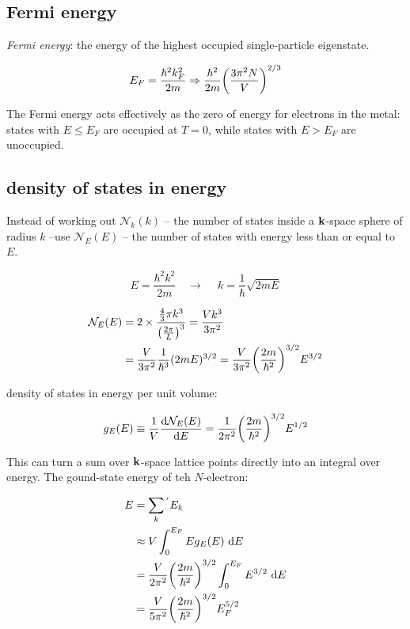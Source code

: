\documentclass[10pt, a4paper, twocolumn]{article}
\newcommand{\deff}[1]{\par \noindent \textit{#1}: }
\newcommand{\arr}{\ensuremath{\longrightarrow\ }}
\begin{document}
\subsection{Fermi energy}

\deff{Fermi energy}
the energy of the highest occupied single-particle eigenstate.

\[ E_F = \frac{\hbar ^2 k_F^2}{2m}
\Rightarrow \frac{\hbar ^2}{2m}
\qty(\frac{3 \pi ^2 N}{V} )^{2/3} \]

The Fermi energy acts effectively as the zero of energy for electrons in the metal: states with $E \leq E_F$ are occupied at $T=0$, while states with $E > E_F$ are unoccupied.

\subsection{density of states in energy}

Instead of working out $\mathcal N _k (k)$ -- the number of states inside a $\vb k$-space sphere of radius $k$ --use $\mathcal N_E(E)$ -- the number of states with energy less than or equal to $E$.

\[ E = \frac{\hbar ^2 k^2}{2m}
\quad \arr \quad k = \frac1\hbar \sqrt{2mE} \]

\begin{equation*}
\begin{aligned}
\mathcal N_E (E) &= 2 \times \frac{\frac43 \pi k^3}
{\qty(\frac{2\pi}{L})^3} = \frac{Vk^3}{3 \pi ^2}
\\ &= \frac{V}{3 \pi ^2} \frac{1}{\hbar ^3}
(2mE)^{3/2}
= \frac{V}{3 \pi ^2} \qty( \frac{2m}{\hbar ^2})^{3/2}
E^{3/2}
\end{aligned}
\end{equation*}

density of states in energy per unit volume:

\[ g_E(E) \equiv \frac1V \dv{\mathcal N_E(E)}{E}
= \frac{1}{2\pi ^2} \qty( \frac{2m}{\hbar ^2})^{3/2}
E^{1/2} \]

This can turn a sum over $\vb k$-space lattice points directly into an integral over energy. The gound-state energy of teh $N$-electron:

\begin{equation*}
\begin{aligned}
E &= \sum _k {}{}^{'} E_k
\\ & \approx V \int _0^{E_F} E g_E(E) \ \dd E\
\\ &= \frac{V}{2\pi ^2} \qty( \frac{2m}{\hbar ^2})^{3/2}
\int _0^{E_F} E^{3/2} \ \dd E
\\ &= \frac{V}{5 \pi ^2} \qty( \frac{2m}{\hbar ^2})^{3/2}
E_F^{5/2}
\end{aligned}
\end{equation*}
\end{document}
